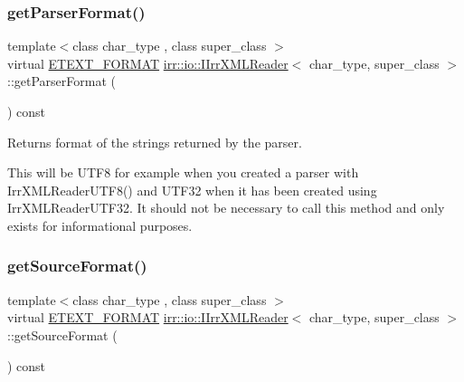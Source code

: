 \subsubsection{\texorpdfstring{get\+Parser\+Format()}{getParserFormat()}}
{\footnotesize\ttfamily template$<$class char\+\_\+type , class super\+\_\+class $>$ \\
virtual \hyperlink{namespaceirr_1_1io_ac7e51e5a6bd00451dec248f497b16a9d}{E\+T\+E\+X\+T\+\_\+\+F\+O\+R\+M\+AT} \hyperlink{classirr_1_1io_1_1IIrrXMLReader}{irr\+::io\+::\+I\+Irr\+X\+M\+L\+Reader}$<$ char\+\_\+type, super\+\_\+class $>$\+::get\+Parser\+Format (\begin{DoxyParamCaption}{ }\end{DoxyParamCaption}) const\hspace{0.3cm}{\ttfamily [pure virtual]}}



Returns format of the strings returned by the parser. 

This will be U\+T\+F8 for example when you created a parser with Irr\+X\+M\+L\+Reader\+U\+T\+F8() and U\+T\+F32 when it has been created using Irr\+X\+M\+L\+Reader\+U\+T\+F32. It should not be necessary to call this method and only exists for informational purposes. \mbox{\label{classirr_1_1io_1_1IIrrXMLReader_a00998ef2d3a562d6b2b8302c3430322d}} 
\subsubsection{\texorpdfstring{get\+Source\+Format()}{getSourceFormat()}}
{\footnotesize\ttfamily template$<$class char\+\_\+type , class super\+\_\+class $>$ \\
virtual \hyperlink{namespaceirr_1_1io_ac7e51e5a6bd00451dec248f497b16a9d}{E\+T\+E\+X\+T\+\_\+\+F\+O\+R\+M\+AT} \hyperlink{classirr_1_1io_1_1IIrrXMLReader}{irr\+::io\+::\+I\+Irr\+X\+M\+L\+Reader}$<$ char\+\_\+type, super\+\_\+class $>$\+::get\+Source\+Format (\begin{DoxyParamCaption}{ }\end{DoxyParamCaption}) const\hspace{0.3cm}{\ttfamily [pure virtual]}}



